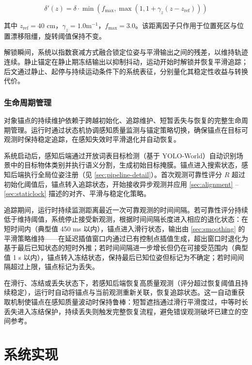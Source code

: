 \documentclass[9pt,twocolumn,letterpaper]{extarticle}
\begin{document}
\begin{equation}
\delta'(z) = \delta \cdot \min\!\left(f_{\mathrm{max}}, \max\!\left(1, 1 + \gamma_z (z - z_{\mathrm{ref}})\right)\right)
\label{eq:distance-adaptive}
\end{equation}


其中 $z_{\mathrm{ref}} = 40$ cm，$\gamma_z = 1.0 \mathrm{m}^{-1}$，$f_{\mathrm{max}} = 3.0$。该距离因子只作用于位置死区与位置漂移阻缰，旋转阈值保持不变。

解锁瞬间，系统以指数衰减方式融合锁定位姿与平滑输出之间的残差，以维持轨迹连续。静止锚定在静止期冻结输出以抑制抖动，运动开始时解锁并恢复平滑追踪；后文通过静止、起停与持续运动条件下的系统表征，分别量化其稳定性收益与转换代价。

\subsubsection{生命周期管理}\label{sec:lifecycle}


对象锚点的持续维护依赖于跨越初始化、追踪维护、短暂丢失与恢复的完整生命周期管理。运行时通过状态机协调感知质量监测与锚定策略切换，确保锚点在目标可观测时保持稳定追踪，在感知失效时平滑退化并自动恢复。

系统启动后，感知后端通过开放词表目标检测（基于 YOLO-World）自动识别场景中的目标物体类别并执行语义分割，生成初始目标掩膜。锚点进入搜索状态，感知后端执行全局位姿注册（见 \ref{sec:pipeline-detail}）。首次观测可靠性评分 $R$ 超过初始化阈值后，锚点转入追踪状态，开始接收异步观测并应用 \ref{sec:alignment} -- \ref{sec:staticlock} 描述的对齐、平滑与稳定化策略。

追踪期间，运行时持续监测距离最近一次可靠观测的时间间隔。若可靠性评分持续低于维持阈值，系统停止接受新观测，根据时间间隔长度进入相应的退化状态：在短时间内（典型值 450 ms 以内），锚点进入滑行状态，输出由 \ref{sec:smoothing} 的平滑策略维持------在延迟插值窗口内通过已有控制点插值生成，超出窗口时退化为基于最后已知状态的短时外推；若时间间隔进一步增长但仍在可接受范围内（典型值 1 s 以内），锚点转入冻结状态，保持最后已知位姿但标记为不确定；若时间间隔超过上限，锚点标记为丢失。

在滑行、冻结或丢失状态下，若感知后端恢复高质量观测（评分超过恢复阈值且持续稳定），运行时自动将锚点与当前观测重新关联，恢复追踪状态。这一自动重获取机制使锚点在感知质量波动时保持鲁棒：短暂遮挡通过滑行平滑度过，中等时长丢失进入冻结保护，持续丢失则触发完整恢复流程，避免错误观测破坏已建立的空间参考。

\section{系统实现}\label{sec:impl}
\end{document}
